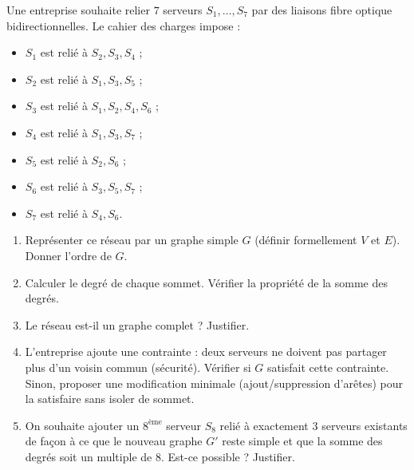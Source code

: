 \documentclass[11pt]{article}
\begin{document}
\begin{exercice}
Une entreprise souhaite relier $7$ serveurs $S_1, \dots, S_7$ par des liaisons fibre optique bidirectionnelles. Le cahier des charges impose :
\begin{itemize}
    \item $S_1$ est relié à $S_2, S_3, S_4$ ;
    \item $S_2$ est relié à $S_1, S_3, S_5$ ;
    \item $S_3$ est relié à $S_1, S_2, S_4, S_6$ ;
    \item $S_4$ est relié à $S_1, S_3, S_7$ ;
    \item $S_5$ est relié à $S_2, S_6$ ;
    \item $S_6$ est relié à $S_3, S_5, S_7$ ;
    \item $S_7$ est relié à $S_4, S_6$.
\end{itemize}
\begin{enumerate}
    \item Représenter ce réseau par un graphe simple $G$ (définir formellement $V$ et $E$). Donner l'ordre de $G$.
    \item Calculer le degré de chaque sommet. Vérifier la propriété de la somme des degrés.
    \item Le réseau est-il un graphe complet ? Justifier.
    \item L'entreprise ajoute une contrainte : deux serveurs ne doivent pas partager plus d'un voisin commun (sécurité). Vérifier si $G$ satisfait cette contrainte. Sinon, proposer une modification minimale (ajout/suppression d'arêtes) pour la satisfaire sans isoler de sommet.
    \item On souhaite ajouter un $8^{\text{ème}}$ serveur $S_8$ relié à exactement $3$ serveurs existants de façon à ce que le nouveau graphe $G'$ reste simple et que la somme des degrés soit un multiple de $8$. Est-ce possible ? Justifier.
\end{enumerate}
\end{exercice}
\end{document}
